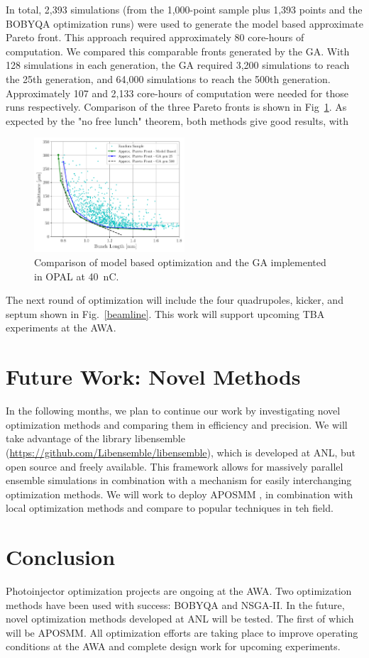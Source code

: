 \documentclass[letterpaper,  %
              ]{jacow-2_3}   %
\begin{document}
In total, 2,393 simulations (from the 1,000-point sample plus 
1,393 points and the BOBYQA optimization runs) were used to
generate the model based approximate Pareto front. 
This approach required approximately 80 core-hours of computation. 
We compared this comparable fronts generated by the GA.
With 128 simulations in each generation, the GA required 3,200
simulations to reach the 25th generation, and 64,000 simulations
to reach the 500th generation. Approximately 107 and 2,133 
core-hours of computation were needed for those runs respectively. 
Comparison of the three Pareto fronts is shown in Fig~\ref{compare}.
As expected by the "no free lunch" theorem, both methods give 
good results, with 
\begin{figure}
	\includegraphics[width=0.5\textwidth]{model_vs_ga}
	\caption{Comparison of model based optimization and the GA implemented in OPAL at \SI{40}{nC}. }
	\label{compare}
\end{figure}

The next round of optimization will include the four quadrupoles, 
kicker, and septum shown in Fig.~\ref{beamline}. This work 
will support upcoming TBA experiments at the AWA.

\section{Future Work: Novel Methods}
In the following months, we plan to continue our work 
by investigating novel optimization methods and comparing them 
in efficiency and precision. We will take advantage of the 
library libensemble (\url{https://github.com/Libensemble/libensemble}), 
which is developed at ANL, but open source and freely available.
This framework allows for massively parallel ensemble simulations in 
combination with a mechanism for easily interchanging optimization methods. 
We will work to deploy APOSMM \cite{jeff}, in combination with local optimization
methods and compare to popular techniques in teh field. 


\section{Conclusion}
Photoinjector optimization projects are ongoing at the AWA.
Two optimization methods have been used with success:
BOBYQA and NSGA-II. In the future, novel optimization 
methods developed at ANL will be tested. The first of 
which will be APOSMM. All optimization efforts are taking 
place to improve operating conditions at the AWA and 
complete design work for upcoming experiments.
\end{document}
